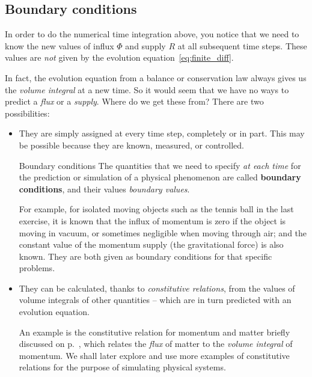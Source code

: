 \documentclass[a4paper,12pt,%
onecolumn,oneside,titlepage,%
british%
]{memoir}
\renewcommand*{\|}[1][]{\nonscript\:#1\vert\nonscript\:\mathopen{}}
\newcommand*{\yH}{\varPhi}%
\newcommand*{\yR}{R}%
\begin{document}
\subsection{Boundary conditions}
\label{sec:boundary_conds}

In order to do the numerical time integration above, you notice that we need to know the new values of influx $\yH$ and supply $\yR$ at all subsequent time steps. These values are \emph{not} given by the evolution equation~\eqref{eq:finite_diff}.

In fact, the evolution equation from a balance or conservation law always gives us the \emph{volume integral} at a new time. So it would seem that we have no ways to predict a \emph{flux} or a \emph{supply}. Where do we get these from? There are two possibilities:
\begin{itemize}[para]
\item They are simply assigned at every time step, completely or in part. This may be possible because they are known, measured, or controlled.
  \begin{definition}{Boundary conditions}
    The quantities that we need to specify \emph{at each time} for the prediction or simulation of a physical phenomenon are called \textbf{boundary conditions}, and their values \emph{boundary values}.
  \end{definition}

  For example, for isolated moving objects such as the tennis ball in the last exercise, it is known that the influx of momentum is zero if the object is moving in vacuum, or sometimes negligible when moving through air; and the constant value of the momentum supply (the gravitational force) is also known. They are both given as boundary conditions for that specific problems.

\item They can be calculated, thanks to \emph{constitutive relations}, from the values of volume integrals of other quantities -- which are in turn predicted with an evolution equation.

  An example is the constitutive relation for momentum and matter briefly discussed on p.~\pageref{item:momentum_mass_velocity}, which relates the \emph{flux} of matter to the \emph{volume integral} of momentum.  We shall later explore and use more examples of constitutive relations for the purpose of simulating physical systems.
\end{itemize}
\end{document}
